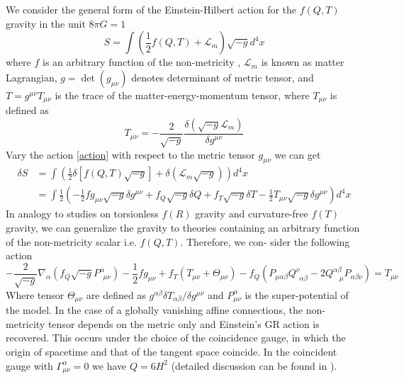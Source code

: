 \documentclass[manuscript]{aastex631}
\begin{document}
We consider the general form of the Einstein-Hilbert action for the $f(Q,T)$ gravity in the unit $8\pi G=1$
\begin{equation}
S=\int(\frac{1}{2}f(Q,T)+\mathcal{L}_m) \sqrt{-g}  d^4x \label{action}
\end{equation}
where $f$ is an arbitrary function of the non-metricity , $\mathcal{L}_m$ is known as matter Lagrangian, $g=\det (g_{\mu \nu})$ denotes determinant of metric tensor, and $T=g^{\mu \nu}T_{\mu \nu}$ is the trace of the matter-energy-momentum tensor, where $T_{\mu \nu}$ is defined as
\begin{equation}
    T_{\mu \nu}=-\frac{2}{\sqrt{-g}}\frac{\delta(\sqrt{-g}\mathcal{L}_m)}{\delta g^{\mu \nu}}
\end{equation}
Vary the action \eqref{action} with respect to the metric tensor $g_{\mu\nu}$ we can get
\begin{align}
\delta S&=\int \left(\frac{1}{2} \delta[f(Q,T) \sqrt{-g}]+\delta(\mathcal{L}_m \sqrt{-g})\right)d^4x \\
&= \int \frac{1}{2}\left(-\frac{1}{2}f g_{\mu\nu}\sqrt{-g}\delta g^{\mu\nu}+f_Q \sqrt{-g} \delta Q+f_T \sqrt{-g}\delta T -\frac{1}{2}T_{\mu \nu}\sqrt{-g}\delta g^{\mu\nu}\right)d^4x
\end{align}
In analogy to studies on torsionless $f(R)$ gravity and
curvature-free $f(T)$ gravity, we can generalize the
gravity to theories containing an arbitrary function of
the non-metricity scalar i.e. $f(Q,T)$. Therefore, we con-
sider the following action
\begin{equation}
-\frac{2}{\sqrt{-g}}\nabla_\alpha(f_Q \sqrt{-g}P^\alpha_{\ \ \mu \nu})-\frac{1}{2}f g_{\mu \nu}+f_T(T_{\mu \nu}+\Theta_{\mu \nu})-f_Q(P_{\mu \alpha \beta}Q^\nu_{\ \ \alpha \beta}-2Q^{\alpha \beta}_{\ \ \ \ \mu}P_{\alpha \beta \nu})=T_{\mu \nu}\label{FieldEq}
\end{equation}
Where tensor $\Theta_{\mu \nu}$ are defined as $g^{\alpha\beta}\delta T_{\alpha\beta}/{\delta g^{\mu\nu}}$ and $P^{\alpha}_{\mu\nu}$ is the super-potential of the model. In the case of a globally vanishing affine connections, the non-metricity tensor depends on the metric
only and Einstein’s GR action is recovered. This occurs
under the choice of the coincidence gauge, in which the
origin of spacetime and that of the tangent space coincide. In the coincident gauge with $\Gamma^{\alpha}_{\mu\nu}=0$ we have $Q=6H^2$ (detailed discussion can be found in \cite{lu2019cosmologysymmetricteleparallelgravity}).
\end{document}
